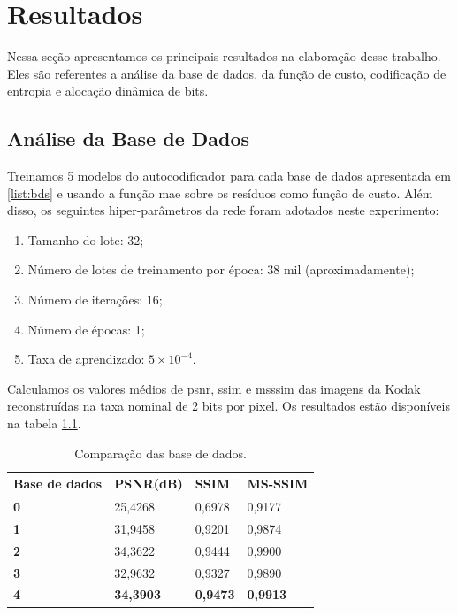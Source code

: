 
\chapter{Resultados}
Nessa seção apresentamos os principais resultados na elaboração desse trabalho. Eles são referentes a análise da base de dados, da função de custo, codificação de entropia e alocação dinâmica de bits. 


\section{Análise da Base de Dados}

Treinamos 5 modelos do autocodificador para cada base de dados apresentada em \ref{list:bds} e usando a função \acrshort{mae} sobre os resíduos como função de custo. Além disso, os seguintes hiper-parâmetros da rede foram adotados neste experimento: 

\begin{enumerate}
	\label{enum:hiper_param}
	\item Tamanho do lote: 32; 
	\item Número de lotes de treinamento por época: 38 mil (aproximadamente);   
	\item Número de iterações: 16;
	\item Número de épocas: 1;
	\item Taxa de aprendizado: $5 \times {10}^{-4}$.
\end{enumerate}

Calculamos os valores médios de \acrshort{psnr}, \acrshort{ssim} e \acrshort{msssim} das imagens da Kodak reconstruídas na taxa nominal de 2 bits por pixel. Os resultados estão disponíveis na tabela \ref{table:comp_datasets}.


\begin{table}[htbp]
	\centering
	\caption[Comparação das base de dados]{Comparação das base de dados.}
	\begin{tabular}{|l|l|l|l|}
		\hline
		\textbf{Base de dados} & \textbf{PSNR(dB)}    & \textbf{SSIM}   & \textbf{MS-SSIM}\\\hline
		\textbf{0}            & 25,4268          & 0,6978          & 0,9177           \\\hline
		\textbf{1}            & 31,9458          & 0,9201          & 0,9874           \\\hline
		\textbf{2}            & 34,3622          & 0,9444          & 0,9900           \\\hline
		\textbf{3}            & 32,9632	       & 0,9327          & 0,9890           \\\hline
		\textbf{4}            & \textbf{34,3903} & \textbf{0,9473} & \textbf{0,9913}     
		\\ \hline
	\end{tabular}
	\label{table:comp_datasets}
\end{table}


